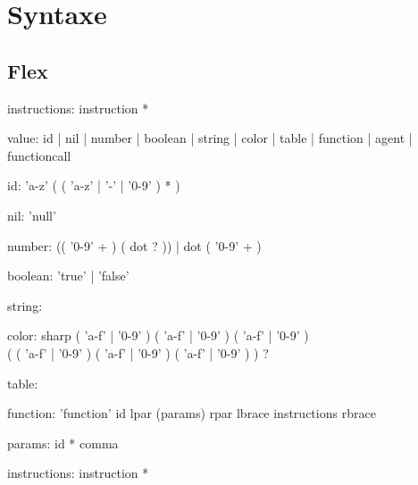 \section{Syntaxe}

\subsection{Flex}

\begin{rail}
	instructions: instruction *
\end{rail}

\begin{rail}
	value: id | nil | number | boolean | string | color | table | function | agent | functioncall
\end{rail}

\begin{rail}
	id: 'a-z' ( ( 'a-z'  | '-' | '0-9' ) * )
\end{rail}

\begin{rail}
	nil: 'null'
\end{rail}

\begin{rail}
	number: (( '0-9' + ) ( dot ? )) | dot ( '0-9' + )
\end{rail}

\begin{rail}
	boolean: 'true' | 'false'
\end{rail}

\begin{rail}
	string:
\end{rail}

\begin{rail}
	color: sharp ( 'a-f' | '0-9' ) ( 'a-f' | '0-9' ) ( 'a-f' | '0-9' ) \\
	       ( ( 'a-f' | '0-9' ) ( 'a-f' | '0-9' ) ( 'a-f' | '0-9' ) ) ?
\end{rail}

\begin{rail}
	table:
\end{rail}

\begin{rail}
	function: 'function' id lpar (params) rpar lbrace instructions rbrace
\end{rail}

\begin{rail}
	params: id * comma
\end{rail}

\begin{rail}
	instructions: instruction *
\end{rail}


